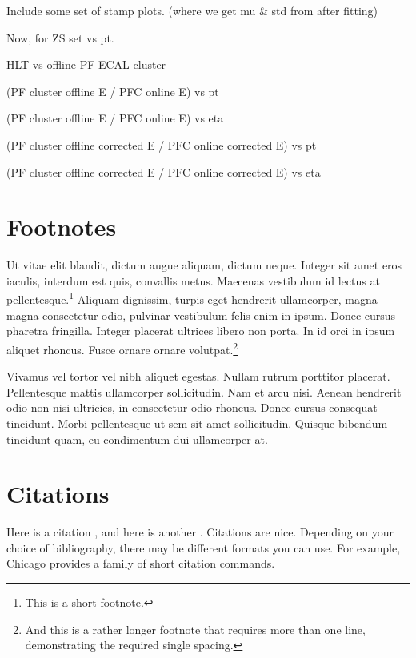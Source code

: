 Include some set of stamp plots. (where we get mu & std from after fitting)

Now, for ZS set vs pt.


HLT vs offline PF ECAL cluster

\caption{(PF cluster offline E / PFC online E) vs pt}
\caption{(PF cluster offline E / PFC online E) vs eta}


\caption{(PF cluster offline corrected E / PFC online corrected E) vs pt}
\caption{(PF cluster offline corrected E / PFC online corrected E) vs eta}

\section{Footnotes}

Ut vitae elit blandit, dictum augue aliquam, dictum neque. Integer sit amet eros
iaculis, interdum est quis, convallis metus. Maecenas vestibulum id lectus at
pellentesque.\footnote{This is a short footnote.} Aliquam dignissim, turpis eget
hendrerit ullamcorper, magna magna consectetur odio, pulvinar vestibulum felis
enim in ipsum. Donec cursus pharetra fringilla. Integer placerat ultrices libero
non porta. In id orci in ipsum aliquet rhoncus. Fusce ornare ornare
volutpat.\footnote{And this is a rather longer footnote that requires more than
one line, demonstrating the required single spacing.}

Vivamus vel tortor vel nibh aliquet egestas. Nullam rutrum porttitor placerat.
Pellentesque mattis ullamcorper sollicitudin. Nam et arcu nisi. Aenean hendrerit
odio non nisi ultricies, in consectetur odio rhoncus. Donec cursus consequat
tincidunt. Morbi pellentesque ut sem sit amet sollicitudin. Quisque bibendum
tincidunt quam, eu condimentum dui ullamcorper at.

\section{Citations}

Here is a citation \cite{fake1}, and here is another \cite{fake2}. Citations are
nice. Depending on your choice of bibliography, there may be different formats
you can use. For example, Chicago provides a family of short citation commands.
